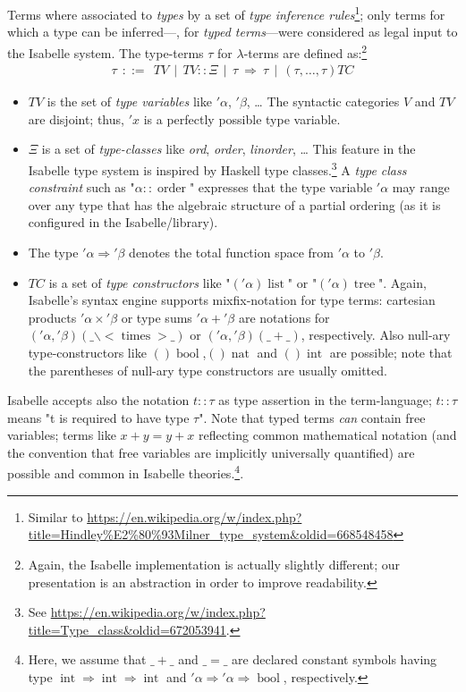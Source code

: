 Terms where associated to \emph{types} by a set of \emph{type
  inference rules}\footnote{Similar to
\url{https://en.wikipedia.org/w/index.php?title=Hindley\%E2\%80\%93Milner_type_system&oldid=668548458}}; only
terms for which a type can be inferred---\ie, for \emph{typed
  terms}---were considered as legal input to the Isabelle
system. The type-terms $\tau$ for $\lambda$-terms are defined
as:\footnote{Again, the Isabelle implementation is actually slightly
  different; our presentation is an abstraction in order to improve
  readability.}
\begin{gather}
\tau~~ ::=~~ TV~~ |~~ TV :: \Xi~~ |~~ \tau~\Rightarrow~\tau~~ |~~ (\tau, \ldots, \tau)TC  
\end{gather}
\begin{itemize}
\item $TV$ is the set of \emph{type variables} like $'\alpha$,
  $'\beta$, \ldots
  The syntactic categories $V$ and $TV$ are disjoint; thus,
  $'x$ is a perfectly possible type variable.
\item $\Xi$ is a set of \emph{type-classes} like \emph{ord},
  \emph{order}, \emph{linorder}, \ldots
  This feature
  in the Isabelle type system is inspired by Haskell type classes.\footnote{See \url{https://en.wikipedia.org/w/index.php?title=Type_class&oldid=672053941}.}
  A \emph{type class constraint} such as "$\alpha::\operatorname{order}$" expresses that
  the type variable $'\alpha$ may range over any type that has the algebraic
  structure of a partial ordering (as it is configured in the Isabelle/\HOL library).
\item The type  $'\alpha \Rightarrow '\beta$  denotes the total function space from
  $'\alpha$ to $'\beta$.
\item $TC$ is a set of \emph{type constructors} like "$('\alpha)\operatorname{list}$" or
  "$('\alpha)\operatorname{tree}$". Again, Isabelle's syntax engine supports mixfix-notation 
  for type terms: cartesian products $'\alpha \times '\beta $ or type sums 
  $'\alpha + '\beta $ are notations for $('\alpha,'\beta)(\_ \backslash<\operatorname{times}> \_)$ or 
  $('\alpha,'\beta)(\_ + \_)$, respectively. Also null-ary type-constructors like 
  $()\operatorname{bool}$,$()\operatorname{nat}$ and $()\operatorname{int}$ are possible;
  note that the parentheses of null-ary type constructors are usually omitted.
\end{itemize}

Isabelle accepts also the notation $t :: \tau$ as type assertion in
the term-language; $t :: \tau$ means "t is required to have type
$\tau$". Note that typed terms \emph{can} contain free variables;
terms like $x + y = y + x$ reflecting common mathematical notation
(and the convention that free variables are implicitly universally
quantified) are possible and common in Isabelle
theories.\footnote{Here, we assume that $\_ + \_$ and $\_ = \_$ are
  declared constant symbols having type
  $\operatorname{int} \Rightarrow \operatorname{int} \Rightarrow
  \operatorname{int}$
  and $'\alpha \Rightarrow '\alpha \Rightarrow \operatorname{bool}$,
  respectively.}.


